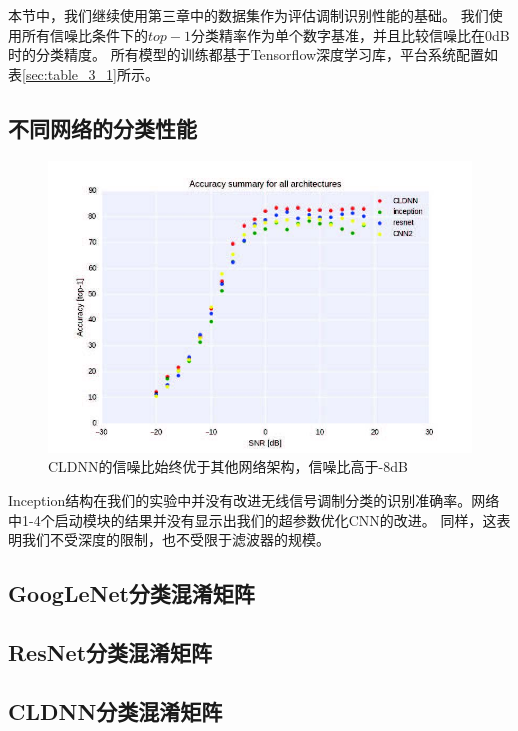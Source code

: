 本节中，我们继续使用第三章中的数据集作为评估调制识别性能的基础。
我们使用所有信噪比条件下的$top-1$分类精率作为单个数字基准，并且比较信噪比在0dB时的分类精度。
所有模型的训练都基于Tensorflow深度学习库，平台系统配置如表\ref{sec:table_3_1}所示。\par
\subsection{不同网络的分类性能}

\begin{figure}[!h]
	\centering
	\includegraphics[scale=1.2]{figures/chapter_5/fig_5_7}
	\caption{CLDNN的信噪比始终优于其他网络架构，信噪比高于-8dB}\label{sec:fig_5_7}
\end{figure}
Inception结构在我们的实验中并没有改进无线信号调制分类的识别准确率。网络中1-4个启动模块的结果并没有显示出我们的超参数优化CNN的改进。 同样，这表明我们不受深度的限制，也不受限于滤波器的规模。\par

\subsection{GoogLeNet分类混淆矩阵}

\subsection{ResNet分类混淆矩阵}

\subsection{CLDNN分类混淆矩阵}

